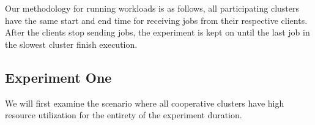Our methodology for running workloads is as follows, all participating clusters
have the same start and end time for receiving jobs from their respective
clients. After the clients stop sending jobs, the experiment is kept on until
the last job in the slowest cluster finish execution. 

\subsection{Experiment One}

\begin{center}
\end{center}
We will first examine the scenario where all cooperative clusters have high
resource utilization for the entirety of the experiment duration.


